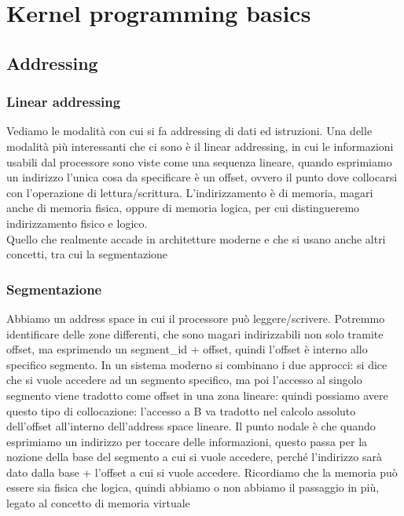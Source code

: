 \documentclass[12pt, oneside]{extbook}
\begin{document}
\chapter{Kernel programming basics}
\section{Addressing}
\subsection{Linear addressing}
Vediamo le modalità con cui si fa addressing di dati ed istruzioni. Una delle modalità più interessanti che ci sono è il linear addressing, in cui le informazioni usabili dal processore sono viste come una sequenza lineare, quando esprimiamo un indirizzo l'unica cosa da specificare è un offset, ovvero il punto dove collocarsi con l'operazione di lettura/scrittura. L'indirizzamento è di memoria, magari anche di memoria fisica, oppure di memoria logica, per cui distingueremo indirizzamento fisico e logico.\\ Quello che realmente accade in architetture moderne e che si usano anche altri concetti, tra cui la segmentazione
\subsection{Segmentazione}
Abbiamo un address space in cui il processore può leggere/scrivere. Potremmo identificare delle zone differenti, che sono magari indirizzabili non solo tramite offset, ma esprimendo un segment\_id + offset, quindi l'offset è interno allo specifico segmento. In un sistema moderno si combinano i due approcci: si dice che si vuole accedere ad un segmento specifico, ma poi l'accesso al singolo segmento viene tradotto come offset in una zona lineare: quindi possiamo avere questo tipo di collocazione:
l'accesso a B va tradotto nel calcolo assoluto dell'offset all'interno dell'address space lineare. Il punto nodale è che quando esprimiamo un indirizzo per toccare delle informazioni, questo passa per la nozione della base del segmento a cui si vuole accedere, perché l'indirizzo sarà dato dalla base + l'offset a cui si vuole accedere. Ricordiamo che la memoria può essere sia fisica che logica, quindi abbiamo o non abbiamo il passaggio in più, legato al concetto di memoria virtuale
\end{document}
